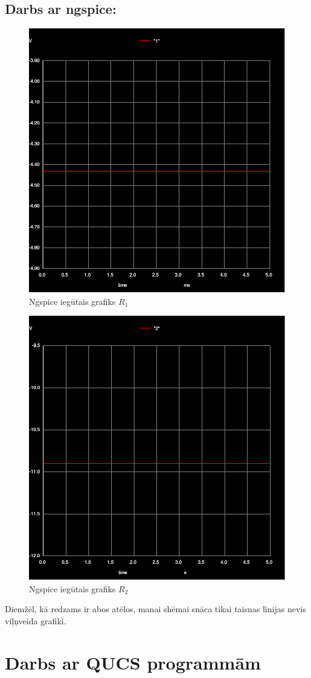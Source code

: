 \documentclass{report}
\begin{document}
    \subsection{Darbs ar ngspice:}
    
        \begin{figure}[h]
            \centering
            \includegraphics[width=.5\textwidth]{Lab.d/data/011.PNG}
            \caption{Ngspice iegūtais grafiks $R_1$}
            \label{fig:my_label3}
        \end{figure}
        
        \begin{figure}[h]
            \centering
            \includegraphics[width=.5\textwidth]{Lab.d/data/012.PNG}
            \caption{Ngspice iegūtais grafiks $R_2$}
            \label{fig:my_label4}
        \end{figure}
        
         \begin{flushleft}
            Diemžēl, kā redzams ir abos atēlos, manai shēmai snāca tikai taisnas līnijas nevis viļņveida grafiki.
        \end{flushleft}
       

\section{Darbs ar QUCS programmām}
\end{document}
